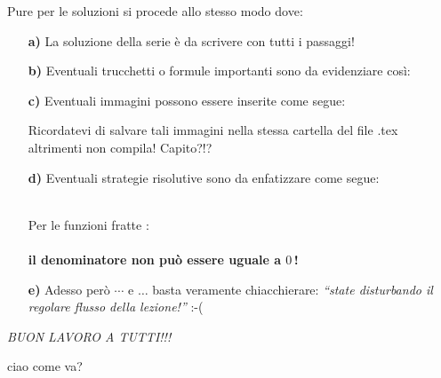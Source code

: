 \documentclass[a4paper,10pt]{article}
\newcommand{\hili}[1]{\colorbox{yellow}{#1}}
\begin{document}
Pure per le soluzioni si procede allo stesso modo dove:
\begin{itemize}
\item[\textbf{a)}] La soluzione della serie \`e da scrivere con tutti i passaggi!
\item[\textbf{b)}] Eventuali trucchetti o formule importanti sono da evidenziare cos\`i:\\
\boxed{\hili{$E=mc^2$}}
\item[\textbf{c)}] Eventuali immagini possono essere inserite come segue:
\begin{center}
\end{center}
Ricordatevi di salvare tali immagini nella stessa cartella del file .tex altrimenti non compila! Capito?!?
\item[\textbf{d)}] Eventuali strategie risolutive sono da enfatizzare come segue:\\\\
\begin{minipage}{3cm}
\begin{center}
\end{center}
\end{minipage}
\hfill
\begin{minipage}{12.5cm}
Per le funzioni fratte :\\\\ \textbf{il denominatore non pu\`o essere uguale a $0$\,!}
\end{minipage} 
\item[\textbf{e)}] Adesso per\`o $\cdots$ e $\ldots$ basta veramente chiacchierare: \textit{``state disturbando il regolare flusso della lezione!''} :-(
\end{itemize}



\begin{center}
\emph{BUON LAVORO A TUTTI!!!}
\end{center}

ciao come va?
\end{document}

